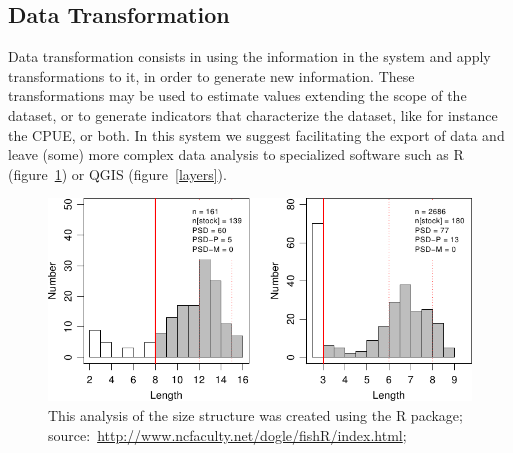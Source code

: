 \documentclass[11pt]{article} %
\begin{document}
\subsection{Data Transformation}\label{transformation}
Data transformation consists in using the information in the system and apply transformations to it, in order to generate new information. These transformations may be used to estimate values extending the scope of the dataset, or to generate indicators that characterize the dataset, like for instance the CPUE, or both. In this system we suggest facilitating the export of data and leave (some) more complex data analysis to specialized software such as R (figure~\ref{lengths}) or QGIS (figure~\ref{layers}).

  \begin{figure}[!ht]%
    \begin{center} 
	\includegraphics[width=\textwidth]{lengths}
      \caption[This analysis of the size structure was created using the R package;]
{This analysis of the size structure was created using the R package; source:~\url{http://www.ncfaculty.net/dogle/fishR/index.html};}
      \label{lengths} %
    \end{center} 
  \end{figure}
\end{document}
